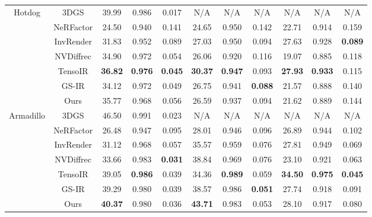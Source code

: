 \documentclass{article} %
\begin{document}
\begin{table}[!thp]
\begin{tabular}{cc|ccc|ccc|ccc}
         \hline \multirow{7}{*}{Hotdog}& 3DGS & 39.99 & 0.986 & 0.017 & N/A & N/A&  N/A& N/A & N/A &  N/A \\
         & NeRFactor & 24.50 & 0.940 & 0.141 & 24.65 & \cellcolor{b}0.950 & 0.142 & \cellcolor{c}22.71 &\cellcolor{c} 0.914 & 0.159 \\
         &InvRender & 31.83 &0.952 & 0.089 & \cellcolor{b}27.03 &\cellcolor{b} 0.950 &\cellcolor{c} 0.094 & \cellcolor{b}27.63 & \cellcolor{b}0.928 & \cellcolor{a}\textbf{0.089} \\
         &NVDiffrec & \cellcolor{c}34.90 & \cellcolor{b}0.972 & \cellcolor{c}0.054 & 26.06 & 0.920 & 0.116 & 19.07 & 0.885 & \cellcolor{c}0.118 \\
         &TensoIR & \cellcolor{a}\textbf{36.82} &\cellcolor{a} \textbf{0.976} &\cellcolor{a} \textbf{0.045} & \cellcolor{a}\textbf{30.37} &\cellcolor{a} \textbf{0.947} & \cellcolor{b}0.093 & \cellcolor{a}\textbf{27.93} & \cellcolor{a}\textbf{0.933} & \cellcolor{b}0.115 \\
         &GS-IR & 34.12 & \cellcolor{b}0.972 &\cellcolor{b} 0.049 & \cellcolor{c}26.75 &\cellcolor{c}0.941 & \cellcolor{a}\textbf{0.088} & 21.57 & 0.888 & 0.140 \\
         &Ours & \cellcolor{b}35.77 &\cellcolor{c} 0.968 & 0.056 & 26.59 & 0.937 & \cellcolor{c}0.094 & 21.62 &0.889 & 0.144 \\

         \hline \multirow{7}{*}{Armadillo}& 3DGS & 46.50 & 0.991 & 0.023 &  N/A & N/A&  N/A& N/A & N/A &  N/A \\ 
          & NeRFactor& 26.48 & 0.947 & 0.095  & 28.01 & 0.946 & 0.096 & 26.89 & \cellcolor{c}0.944 & 0.102 \\
         &InvRender& 31.12 & 0.968 & 0.057 & 35.57 & 0.959 & 0.076 & \cellcolor{c}27.81 &\cellcolor{b} 0.949 &\cellcolor{c} 0.069 \\
         & NVDiffrec& 33.66 &\cellcolor{b} 0.983 & \cellcolor{a}\textbf{0.031} & \cellcolor{b}38.84 & 0.969 & 0.076 & 23.10 & 0.921 & \cellcolor{b}0.063 \\
         & TensoIR& \cellcolor{c}39.05 & \cellcolor{a}\textbf{0.986} & \cellcolor{c}0.039 & 34.36 &\cellcolor{a} \textbf{0.989} & \cellcolor{c}0.059 & \cellcolor{a}\textbf{34.50} & \cellcolor{a}\textbf{0.975} &\cellcolor{a} \textbf{0.045} \\
         & GS-IR& \cellcolor{b}39.29 & \cellcolor{c}0.980 & \cellcolor{c}0.039 & \cellcolor{c}38.57 &\cellcolor{b} 0.986 &\cellcolor{a} \textbf{0.051} & 27.74 & 0.918 & 0.091 \\
         &Ours &\cellcolor{a}\textbf{ 40.37} & \cellcolor{c}0.980 &\cellcolor{b} 0.036 & \cellcolor{a}\textbf{43.71} &\cellcolor{c} 0.983 &\cellcolor{b} 0.053 & \cellcolor{b}28.10 & 0.917 & 0.080 \\
         

\end{tabular}
\end{table}
\end{document}
